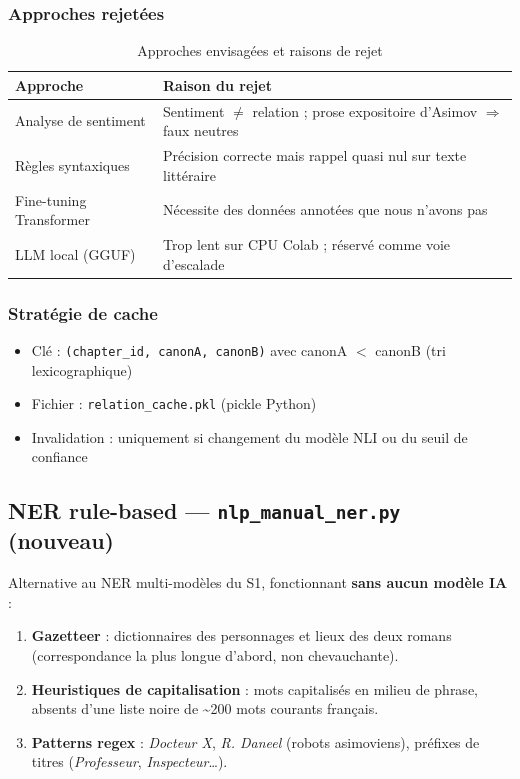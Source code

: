 \documentclass[a4paper,11pt]{article}
\begin{document}
\subsubsection*{Approches rejetées}

\begin{table}[H]
  \centering
  \footnotesize
  \begin{tabular}{lp{9.5cm}}
    \toprule
    \textbf{Approche} & \textbf{Raison du rejet} \\
    \midrule
    Analyse de sentiment   & Sentiment $\neq$ relation ; prose expositoire d'Asimov $\Rightarrow$ faux neutres \\
    Règles syntaxiques     & Précision correcte mais rappel quasi nul sur texte littéraire \\
    Fine-tuning Transformer & Nécessite des données annotées que nous n'avons pas \\
    LLM local (GGUF)       & Trop lent sur CPU Colab ; réservé comme voie d'escalade \\
    \bottomrule
  \end{tabular}
  \caption{Approches envisagées et raisons de rejet}
\end{table}

\subsubsection*{Stratégie de cache}

\begin{itemize}[noitemsep]
  \item Clé : \texttt{(chapter\_id, canonA, canonB)} avec canonA $<$ canonB (tri lexicographique)
  \item Fichier : \texttt{relation\_cache.pkl} (pickle Python)
  \item Invalidation : uniquement si changement du modèle NLI ou du seuil de confiance
\end{itemize}

\subsection{NER rule-based — \texttt{nlp\_manual\_ner.py} (nouveau)}

Alternative au NER multi-modèles du S1, fonctionnant \textbf{sans aucun modèle IA} :

\begin{enumerate}[noitemsep]
  \item \textbf{Gazetteer} : dictionnaires des personnages et lieux des deux romans (correspondance la
        plus longue d'abord, non chevauchante).
  \item \textbf{Heuristiques de capitalisation} : mots capitalisés en milieu de phrase, absents d'une
        liste noire de \textasciitilde{}200 mots courants français.
  \item \textbf{Patterns regex} : \textit{Docteur X}, \textit{R. Daneel} (robots asimoviens), préfixes
        de titres (\textit{Professeur}, \textit{Inspecteur}\ldots).
\end{enumerate}
\end{document}
